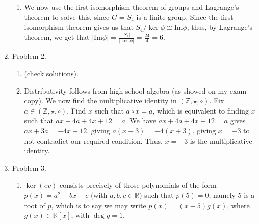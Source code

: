 \begin{enumerate}
\begin{enumerate}
	\item We now use the first isomorphism theorem of groups and Lagrange's theorem to solve this, since $G = S_4$ is a finite group. Since the first isomorphism theorem gives us that $S_4 / \ker\phi \cong \textrm{Im}\phi$, thus, by Lagrange's theorem, we get that $|\textrm{Im}\phi| = \frac{|S_4|}{|\ker\phi|} = \frac{24}{4} = 6$. 
	\end{enumerate}
	\item Problem 2. 
	\begin{enumerate}
		\item (check solutions). 
		\item Distributivity follows from high school algebra (as showed on my exam copy). We now find the multiplicative identity in $(\mathbb{Z}, \star, \circ)$. Fix $a \in (\mathbb{Z}, \star, \circ)$. Find $x$ such that $a \circ x = a$, which is equivalent to finding $x$ such that $ax + 4a + 4x + 12 = a$. We have $ax + 4a + 4x + 12 = a$ gives $ax+3a = -4x-12$, giving $a(x+3) = -4(x+3)$, giving $x=-3$ to not contradict our required condition. Thus, $x=-3$ is the multiplicative identity. 
	\end{enumerate}
	\item Problem 3. 
	\begin{enumerate}
		\item $\ker(ev)$ consists precisely of those polynomials of the form $p(x) = a^2 + bx +c$ (with $a,b,c \in \mathbb{R}$) such that $p(5)=0$, namely 5 is a root of $p$, which is to say we may write $p(x)=(x-5)g(x)$, where $g(x) \in \mathbb{R}[x]$, with $\deg g = 1$. 

\end{enumerate}
\end{enumerate}

